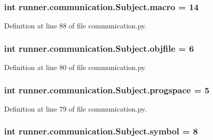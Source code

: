 \subsubsection[{macro}]{\setlength{\rightskip}{0pt plus 5cm}int runner.\+communication.\+Subject.\+macro = 14\hspace{0.3cm}{\ttfamily [static]}}\label{classrunner_1_1communication_1_1Subject_a23b2d4b86ba5b310a6566381a25c83d9}


Definition at line 88 of file communication.\+py.

\hypertarget{classrunner_1_1communication_1_1Subject_af25d538f805497fc2d9604d4e972edd0}{}
\subsubsection[{objfile}]{\setlength{\rightskip}{0pt plus 5cm}int runner.\+communication.\+Subject.\+objfile = 6\hspace{0.3cm}{\ttfamily [static]}}\label{classrunner_1_1communication_1_1Subject_af25d538f805497fc2d9604d4e972edd0}


Definition at line 80 of file communication.\+py.

\hypertarget{classrunner_1_1communication_1_1Subject_aeb21e4d206607a3997f69aa1f9b52f9c}{}
\subsubsection[{progspace}]{\setlength{\rightskip}{0pt plus 5cm}int runner.\+communication.\+Subject.\+progspace = 5\hspace{0.3cm}{\ttfamily [static]}}\label{classrunner_1_1communication_1_1Subject_aeb21e4d206607a3997f69aa1f9b52f9c}


Definition at line 79 of file communication.\+py.

\hypertarget{classrunner_1_1communication_1_1Subject_a708dc59379eed8dcb07fda0bf9c18f50}{}
\subsubsection[{symbol}]{\setlength{\rightskip}{0pt plus 5cm}int runner.\+communication.\+Subject.\+symbol = 8\hspace{0.3cm}{\ttfamily [static]}}\label{classrunner_1_1communication_1_1Subject_a708dc59379eed8dcb07fda0bf9c18f50}


